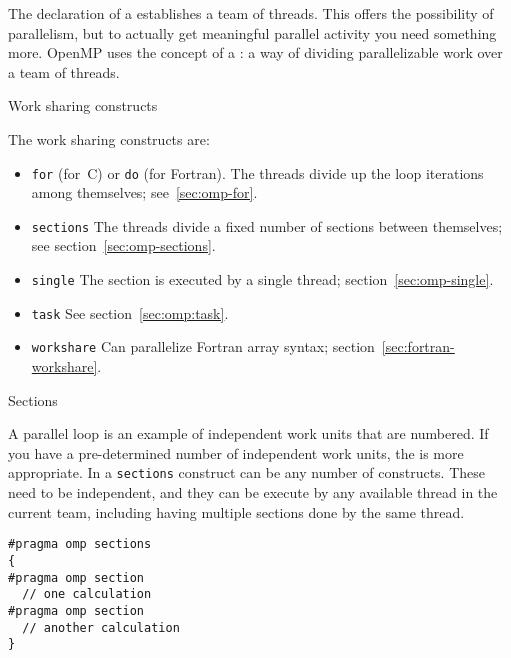 
The declaration of a  establishes a team of
threads. This offers the possibility of parallelism, but to actually
get meaningful parallel activity you need something more.
OpenMP uses the concept of a : a way of dividing parallelizable work over a team of threads.

 {Work sharing constructs}
\label{sec:work-sharing}

The work sharing constructs are:
\begin{itemize}
\item \texttt{for} (for~C) or
  \texttt{do} (for Fortran). The threads divide up the loop iterations among
  themselves; see~\ref{sec:omp-for}.
\item \texttt{sections} The threads divide a fixed number of sections
  between themselves; see section~\ref{sec:omp-sections}.
\item \texttt{single} The section is executed by a single thread;
  section~\ref{sec:omp-single}.
\item \texttt{task} See section~\ref{sec:omp:task}.
\item \texttt{workshare} Can parallelize Fortran array syntax;
  section~\ref{sec:fortran-workshare}.
\end{itemize}

 {Sections}
\label{sec:omp-sections}

A parallel loop is an example of independent work units that are numbered.
If you have a pre-determined number of independent work units, 
the  is more appropriate. In a \lstinline{sections} construct
can be any number of  constructs. These need to be
independent, and they can be execute by any available thread in the current team,
including having multiple sections done by the same thread.
\begin{lstlisting}
#pragma omp sections
{
#pragma omp section
  // one calculation
#pragma omp section
  // another calculation
}
\end{lstlisting}

